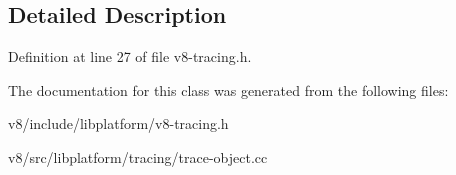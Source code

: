 \subsection{Detailed Description}


Definition at line 27 of file v8-\/tracing.\+h.



The documentation for this class was generated from the following files\+:\begin{DoxyCompactItemize}
\item 
v8/include/libplatform/v8-\/tracing.\+h\item 
v8/src/libplatform/tracing/trace-\/object.\+cc\end{DoxyCompactItemize}
